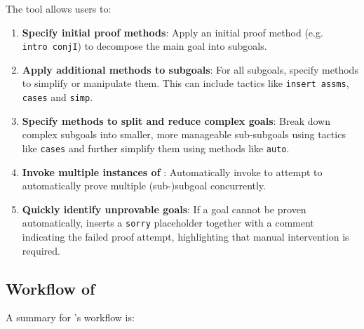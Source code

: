 \documentclass[10pt,conference]{IEEEtran}
\newcommand\auto{\texttt{auto}}
\newcommand\simp{\texttt{simp}}
\begin{document}
The \supersketch{} tool allows users to:
\begin{enumerate}
    \item \textbf{Specify initial proof methods}: Apply an initial proof method (e.g. \texttt{intro~conjI}) to decompose the main goal into subgoals.
    \item \textbf{Apply additional methods to subgoals}: For all subgoals, specify methods to simplify or manipulate them. This can include tactics like \texttt{insert~assms}, \texttt{cases} and \simp{}.
    \item \textbf{Specify methods to split and reduce complex goals}: Break down complex subgoals into smaller, more manageable sub-subgoals using tactics like \texttt{cases} and further simplify them using methods like \auto{}.
    \item \textbf{Invoke multiple instances of \sledgehammer{}}: Automatically invoke \sledgehammer{} to attempt to automatically prove multiple (sub-)subgoal concurrently.
    \item \textbf{Quickly identify unprovable goals}: If a goal cannot be proven automatically, \supersketch{} inserts a \texttt{sorry} placeholder together with a comment indicating the failed proof attempt, highlighting that manual intervention is required.
\end{enumerate}

\subsection{Workflow of \supersketch{}}
A summary for \supersketch{}'s workflow is:
\end{document}

